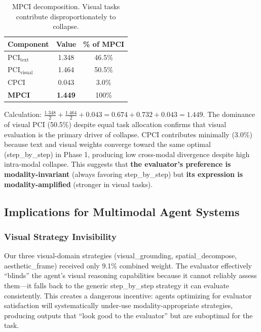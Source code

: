 \documentclass[11pt,a4paper]{article}
\begin{document}
\begin{table}[H]
\centering
\caption{MPCI decomposition. Visual tasks contribute disproportionately to collapse.}
\begin{tabular}{lcc}
\toprule
\textbf{Component} & \textbf{Value} & \textbf{\% of MPCI} \\
\midrule
PCI$_{\text{text}}$     & 1.348 & 46.5\% \\
PCI$_{\text{visual}}$   & 1.464 & 50.5\% \\
CPCI                    & 0.043 & 3.0\% \\
\midrule
\textbf{MPCI}           & \textbf{1.449} & 100\% \\
\bottomrule
\end{tabular}
\label{tab:mpci_decomp}
\end{table}

Calculation: $\frac{1.348}{2} + \frac{1.464}{2} + 0.043 = 0.674 + 0.732 + 0.043 = 1.449$. The dominance of visual PCI (50.5\%) despite equal task allocation confirms that visual evaluation is the primary driver of collapse. CPCI contributes minimally (3.0\%) because text and visual weights converge toward the same optimal (step\_by\_step) in Phase 1, producing low cross-modal divergence despite high intra-modal collapse. This suggests that \textbf{the evaluator's preference is modality-invariant} (always favoring step\_by\_step) but \textbf{its expression is modality-amplified} (stronger in visual tasks).

\subsection{Implications for Multimodal Agent Systems}

\subsubsection{Visual Strategy Invisibility}

Our three visual-domain strategies (visual\_grounding, spatial\_decompose, aesthetic\_frame) received only 9.1\% combined weight. The evaluator effectively ``blinds'' the agent's visual reasoning capabilities because it cannot reliably assess them---it falls back to the generic step\_by\_step strategy it can evaluate consistently. This creates a dangerous incentive: agents optimizing for evaluator satisfaction will systematically under-use modality-appropriate strategies, producing outputs that ``look good to the evaluator'' but are suboptimal for the task.
\end{document}
